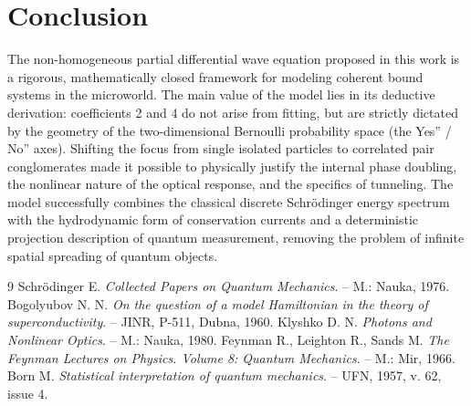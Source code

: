 \documentclass{article}
\begin{document}
\section{Conclusion}The non-homogeneous partial differential wave equation proposed in this work is a rigorous, mathematically closed framework for modeling coherent bound systems in the microworld. The main value of the model lies in its deductive derivation: coefficients 2 and 4 do not arise from fitting, but are strictly dictated by the geometry of the two-dimensional Bernoulli probability space (the Yes'' / No'' axes). Shifting the focus from single isolated particles to correlated pair conglomerates made it possible to physically justify the internal phase doubling, the nonlinear nature of the optical response, and the specifics of tunneling. The model successfully combines the classical discrete Schrödinger energy spectrum with the hydrodynamic form of conservation currents and a deterministic projection description of quantum measurement, removing the problem of infinite spatial spreading of quantum objects.

\begin{thebibliography}{9} Schrödinger E. \textit{Collected Papers on Quantum Mechanics}. – M.: Nauka, 1976. Bogolyubov N. N. \textit{On the question of a model Hamiltonian in the theory of superconductivity}. – JINR, P-511, Dubna, 1960. Klyshko D. N. \textit{Photons and Nonlinear Optics}. – M.: Nauka, 1980. Feynman R., Leighton R., Sands M. \textit{The Feynman Lectures on Physics. Volume 8: Quantum Mechanics}. – M.: Mir, 1966. Born M. \textit{Statistical interpretation of quantum mechanics}. – UFN, 1957, v. 62, issue 4.\end{thebibliography}
\end{document}
